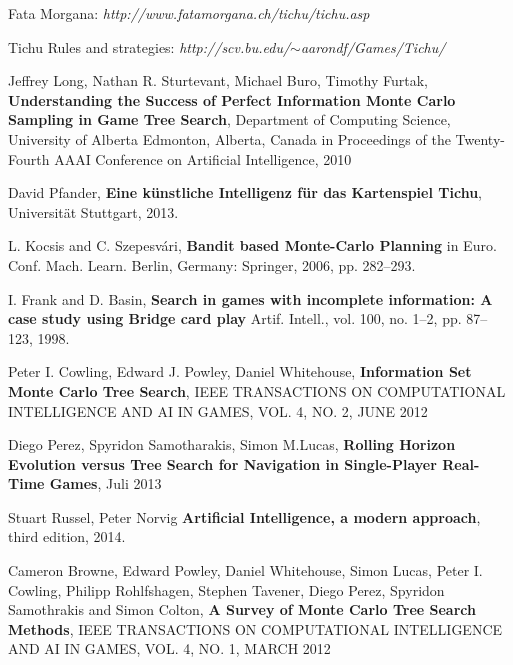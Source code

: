 

\begin{thebibliography}{99}

Fata Morgana: \textit{http://www.fatamorgana.ch/tichu/tichu.asp}

Tichu Rules and strategies: \textit{http://scv.bu.edu/$\sim$aarondf/Games/Tichu/}

Jeffrey Long, Nathan R. Sturtevant, Michael Buro, Timothy Furtak,
\textbf{Understanding the Success of Perfect Information Monte Carlo Sampling in Game Tree Search},
Department of Computing Science, University of Alberta Edmonton, Alberta, Canada
in Proceedings of the Twenty-Fourth AAAI Conference on Artificial Intelligence, 2010

David Pfander,
\textbf{Eine künstliche Intelligenz für das Kartenspiel Tichu},
Universität Stuttgart,
2013.

L. Kocsis and C. Szepesvári, \textbf{Bandit based Monte-Carlo Planning} in Euro. Conf. Mach. Learn. Berlin, Germany: Springer, 2006, pp. 282–293.

I. Frank and D. Basin, \textbf{Search in games with incomplete information: A case study using Bridge card play}
Artif. Intell., vol. 100, no. 1–2,
pp. 87–123, 1998.

Peter I. Cowling, Edward J. Powley, Daniel Whitehouse,
\textbf{Information Set Monte Carlo Tree Search},
IEEE TRANSACTIONS ON COMPUTATIONAL INTELLIGENCE AND AI IN GAMES, VOL. 4, NO. 2,
JUNE 2012

Diego Perez, Spyridon Samotharakis, Simon M.Lucas,
\textbf{Rolling Horizon Evolution versus Tree Search for Navigation in Single-Player Real-Time Games},
Juli 2013

Stuart Russel, Peter Norvig
\textbf{Artificial Intelligence, a modern approach},
third edition,
2014.

Cameron Browne, Edward Powley, Daniel Whitehouse, Simon Lucas, Peter I. Cowling, Philipp Rohlfshagen, Stephen Tavener, Diego Perez, Spyridon Samothrakis and Simon Colton,
\textbf{A Survey of Monte Carlo Tree Search Methods},
IEEE TRANSACTIONS ON COMPUTATIONAL INTELLIGENCE AND AI IN GAMES, VOL. 4, NO. 1,
MARCH 2012




\end{thebibliography}
